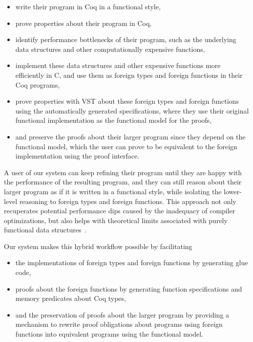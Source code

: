 \begin{itemize}
\item write their program in Coq in a functional style, 
\item prove properties about their program in Coq, 
\item identify performance bottlenecks of their program, such as the underlying data structures and other computationally expensive functions,
\item implement these data structures and other expensive functions more efficiently in C, and use them as \gls{foreign type}s and \gls{foreign function}s in their Coq programs,
\newpage
\item prove properties with VST about these \gls{foreign type}s and \gls{foreign function}s using the automatically generated specifications, where they use their original functional implementation as the functional model for the proofs,
\item and preserve the proofs about their larger program since they depend on the functional model, which the user can prove to be equivalent to the foreign implementation using the proof interface.
\end{itemize}

A user of our system can keep refining their program until they are happy with the performance of the resulting program, and they can still reason about their larger program as if it is written in a functional style, while isolating the lower-level reasoning to \gls{foreign type}s and \gls{foreign function}s. This approach not only recuperates potential performance dips caused by the inadequacy of compiler optimizations, but also helps with theoretical limits associated with purely functional data structures~\cite{ponder1988applicative, amram1992pointers, pippenger96pure, okasaki1999purely}.

Our system makes this hybrid workflow possible by facilitating
\begin{itemize}
\item the implementations of \gls{foreign type}s and \gls{foreign function}s by generating glue code,
\item proofs about the \gls{foreign function}s by generating function specifications and memory predicates about Coq types,
\item and the preservation of proofs about the larger program by providing a mechanism to rewrite proof obligations about programs using \gls{foreign function}s into equivalent programs using the functional model.
\end{itemize}
